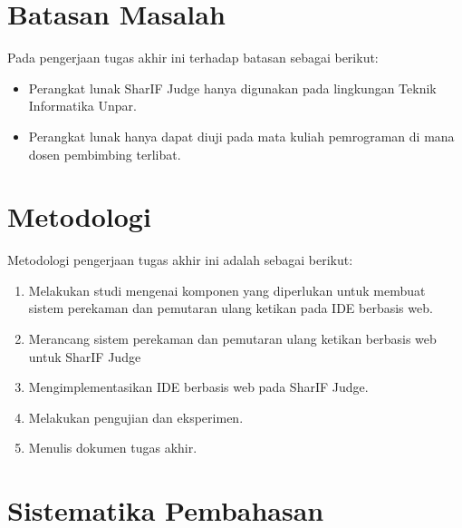 \section{Batasan Masalah}
\label{sec:1:batasan}

Pada pengerjaan tugas akhir ini terhadap batasan sebagai berikut:
\begin{itemize}
    \item Perangkat lunak SharIF Judge hanya digunakan pada lingkungan Teknik Informatika Unpar.
    \item Perangkat lunak hanya dapat diuji pada mata kuliah pemrograman di mana dosen pembimbing terlibat.
\end{itemize}

\section{Metodologi}
\label{sec:1:metlit}

Metodologi pengerjaan tugas akhir ini adalah sebagai berikut:
\begin{enumerate}
    \item Melakukan studi mengenai komponen yang diperlukan untuk membuat sistem perekaman dan pemutaran ulang ketikan pada IDE berbasis web.
    \item Merancang sistem perekaman dan pemutaran ulang ketikan berbasis web untuk SharIF Judge
    \item Mengimplementasikan IDE berbasis web pada SharIF Judge.
    \item Melakukan pengujian dan eksperimen.
    \item Menulis dokumen tugas akhir.
\end{enumerate}

\section{Sistematika Pembahasan}
\label{sec:1:sispem}

